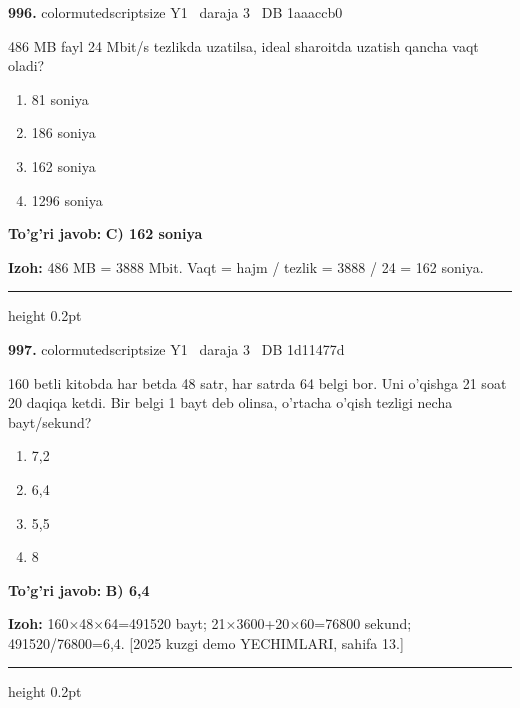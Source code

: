 \documentclass[10pt,a4paper,oneside]{article}
\begin{document}
\noindent\textbf{\color{ink}996.}  {color{muted}scriptsize Y1 \textbullet\ daraja 3 \textbullet\ DB 1aaaccb0}
\par
486 MB fayl 24 Mbit/s tezlikda uzatilsa, ideal sharoitda uzatish qancha vaqt oladi?
\begin{enumerate}[label=\Alph*),leftmargin=9mm]
\item 81 soniya
\item 186 soniya
\item 162 soniya
\item 1296 soniya
\end{enumerate}
\begin{tcolorbox}[enhanced,breakable,colback=teal!4,colframe=teal!50!black,boxrule=0.5pt,arc=1.1mm,left=3mm,right=3mm,top=1.7mm,bottom=1.7mm,before skip=2mm,after skip=2mm]
\textbf{\color{teal}To'g'ri javob:} \textbf{C) 162 soniya}
\par\smallskip
\textbf{Izoh:} 486 MB = 3888 Mbit. Vaqt = hajm / tezlik = 3888 / 24 = 162 soniya.
\end{tcolorbox}
\vspace{2mm}\hrule height 0.2pt \vspace{3mm}

\noindent\textbf{\color{ink}997.}  {color{muted}scriptsize Y1 \textbullet\ daraja 3 \textbullet\ DB 1d11477d}
\par
160 betli kitobda har betda 48 satr, har satrda 64 belgi bor. Uni o'qishga 21 soat 20 daqiqa ketdi. Bir belgi 1 bayt deb olinsa, o'rtacha o'qish tezligi necha bayt/sekund?
\begin{enumerate}[label=\Alph*),leftmargin=9mm]
\item 7,2
\item 6,4
\item 5,5
\item 8
\end{enumerate}
\begin{tcolorbox}[enhanced,breakable,colback=teal!4,colframe=teal!50!black,boxrule=0.5pt,arc=1.1mm,left=3mm,right=3mm,top=1.7mm,bottom=1.7mm,before skip=2mm,after skip=2mm]
\textbf{\color{teal}To'g'ri javob:} \textbf{B) 6,4}
\par\smallskip
\textbf{Izoh:} 160\ensuremath{\times}48\ensuremath{\times}64=491520 bayt; 21\ensuremath{\times}3600+20\ensuremath{\times}60=76800 sekund; 491520/76800=6,4. [2025 kuzgi demo YECHIMLARI, sahifa 13.]
\end{tcolorbox}
\vspace{2mm}\hrule height 0.2pt \vspace{3mm}
\end{document}
